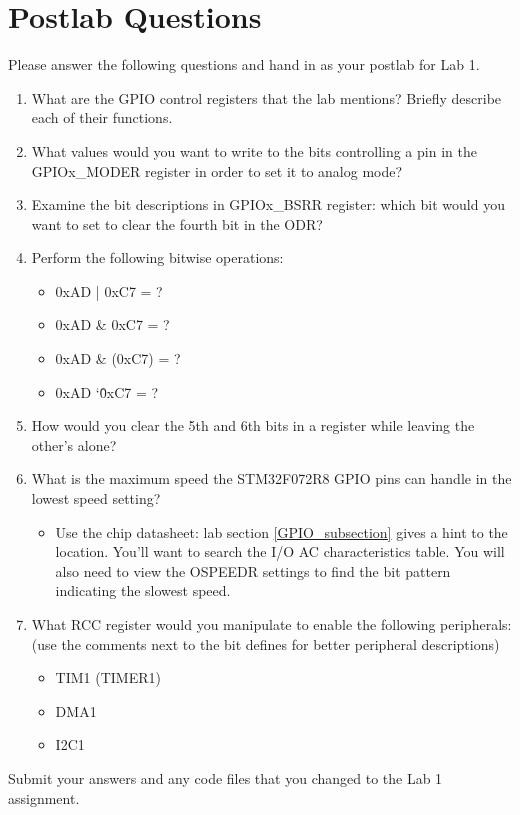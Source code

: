 \documentclass[openany,11pt,fleqn]{book} %
\newcommand\XOR{\char`\^}
\begin{document}
\section{\color{blue}Postlab Questions}
\begin{question}[Postlab 1]
	Please answer the following questions and hand in as your postlab for Lab 1.
	\begin{enumerate}
		\item What are the GPIO control registers that the lab mentions? Briefly describe each of their functions.
		\item What values would you want to write to the bits controlling a pin in the GPIOx\_MODER register in order to set it to analog mode? 
		\item Examine the bit descriptions in GPIOx\_BSRR register: which bit would you want to set to clear the fourth bit  in the ODR?
		\item Perform the following bitwise operations:
		\begin{itemize}
			\item 0xAD | 0xC7 = ?
			\item 0xAD \& 0xC7 = ?
			\item 0xAD \& \texttildelow(0xC7) = ?
			\item 0xAD \XOR 0xC7 = ?
		\end{itemize}
		\item How would you clear the 5th and 6th bits in a register while leaving the other's alone?
		\item What is the maximum speed the STM32F072R8 GPIO pins can handle in the lowest speed setting?
		\begin{itemize}
			\item Use the chip datasheet: lab section \ref{GPIO_subsection} gives a hint to the location. You'll want to search the I/O AC characteristics table. You will also need to view the OSPEEDR settings to find the bit pattern indicating the slowest speed.
		\end{itemize}
		\item What RCC register would you manipulate to enable the following peripherals: (use the comments next to the bit defines for better peripheral descriptions)
		\begin{itemize}
			\item TIM1 (TIMER1)
			\item DMA1
			\item I2C1
		\end{itemize}
		
	\end{enumerate}
	Submit your answers and any code files that you changed to the Lab 1 assignment.
\end{question}
\end{document}
